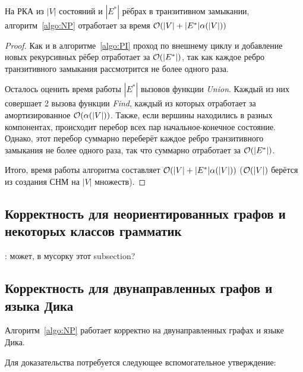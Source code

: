 \begin{theorem}
  На РКА из $|V|$ состояний и $|E^{*}|$ рёбрах в транзитивном замыкании, алгоритм~\ref{algo:NP} отработает за время $\mathcal{O}(|V| + |E^{*}| \alpha(|V|))$
\end{theorem}

\begin{proof}
  Как и в алгоритме~\ref{algo:PI} проход по внешнему циклу и добавление новых рекурсивных рёбер отработает за $\mathcal{O}(|E^{*}|)$, так как каждое ребро транзитивного замыкания рассмотрится не более одного раза.

  Осталось оценить время работы $|E^{*}|$ вызовов функции \textit{Union}. Каждый из них совершает 2 вызова функции \textit{Find}, каждый из которых отработает за амортизированное $\mathcal{O}(\alpha(|V|))$. Также, если вершины находились в разных компонентах, происходит перебор всех пар начальное-конечное состояние. Однако, этот перебор суммарно переберёт каждое ребро транзитивного замыкания не более одного раза, так что суммарно отработает за $\mathcal{O}(|E^{*}|)$.

  Итого, время работы алгоритма составляет $\mathcal{O}(|V| + |E^{*}| \alpha(|V|))$ ($\mathcal{O}(|V|)$ берётся из создания СНМ на $|V|$ множеств). 
\end{proof}

\subsection{Корректность для неориентированных графов и некоторых классов грамматик}

\TODO: может, в мусорку этот subsection?

\subsection{Корректность для двунаправленных графов и языка Дика}

\begin{theorem}\label{th:bidir_corr}
  Алгоритм~\ref{algo:NP} работает корректно на двунаправленных графах и языке Дика.
\end{theorem}


Для доказательства потребуется следующее вспомогательное утверждение:

